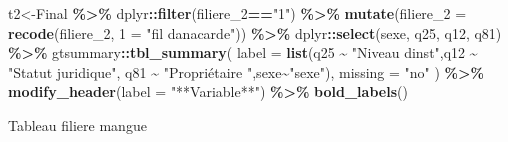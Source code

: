 \documentclass[
]{article}
\newenvironment{Shaded}{\begin{snugshade}}{\end{snugshade}}
\newcommand{\AttributeTok}[1]{\textcolor[rgb]{0.13,0.29,0.53}{#1}}
\newcommand{\FunctionTok}[1]{\textcolor[rgb]{0.13,0.29,0.53}{\textbf{#1}}}
\newcommand{\NormalTok}[1]{#1}
\newcommand{\OtherTok}[1]{\textcolor[rgb]{0.56,0.35,0.01}{#1}}
\newcommand{\SpecialCharTok}[1]{\textcolor[rgb]{0.81,0.36,0.00}{\textbf{#1}}}
\newcommand{\StringTok}[1]{\textcolor[rgb]{0.31,0.60,0.02}{#1}}
\begin{document}
\begin{Shaded}
\begin{Highlighting}[]
\NormalTok{t2}\OtherTok{\textless{}{-}}\NormalTok{Final }\SpecialCharTok{\%\textgreater{}\%}
\NormalTok{  dplyr}\SpecialCharTok{::}\FunctionTok{filter}\NormalTok{(filiere\_2}\SpecialCharTok{==}\StringTok{"1"}\NormalTok{) }\SpecialCharTok{\%\textgreater{}\%} 
  \FunctionTok{mutate}\NormalTok{(}\AttributeTok{filiere\_2 =} \FunctionTok{recode}\NormalTok{(filiere\_2, }\StringTok{\textasciigrave{}}\AttributeTok{1}\StringTok{\textasciigrave{}} \OtherTok{=} \StringTok{"fil d\textquotesingle{}anacarde"}\NormalTok{)) }\SpecialCharTok{\%\textgreater{}\%}
\NormalTok{  dplyr}\SpecialCharTok{::}\FunctionTok{select}\NormalTok{(sexe, q25, q12, q81) }\SpecialCharTok{\%\textgreater{}\%}
\NormalTok{  gtsummary}\SpecialCharTok{::}\FunctionTok{tbl\_summary}\NormalTok{(}
    \AttributeTok{label =} \FunctionTok{list}\NormalTok{(q25 }\SpecialCharTok{\textasciitilde{}} \StringTok{"Niveau d\textquotesingle{}inst"}\NormalTok{,q12 }\SpecialCharTok{\textasciitilde{}} \StringTok{"Statut juridique"}\NormalTok{,}
\NormalTok{            q81 }\SpecialCharTok{\textasciitilde{}} \StringTok{"Propriétaire "}\NormalTok{,sexe}\SpecialCharTok{\textasciitilde{}}\StringTok{"sexe"}\NormalTok{),}
          \AttributeTok{missing =} \StringTok{"no"}
\NormalTok{        ) }\SpecialCharTok{\%\textgreater{}\%} \FunctionTok{modify\_header}\NormalTok{(}\AttributeTok{label =} \StringTok{"**Variable**"}\NormalTok{) }\SpecialCharTok{\%\textgreater{}\%} 
  \FunctionTok{bold\_labels}\NormalTok{()}
\end{Highlighting}
\end{Shaded}

Tableau filiere mangue
\end{document}
